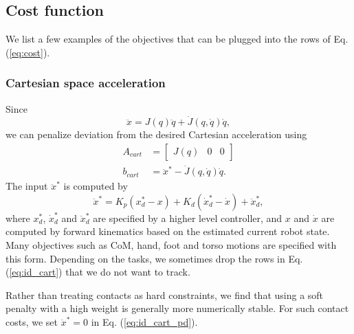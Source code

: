 \documentclass{ws-ijhr}
\newcommand{\eref}[1] {Eq. (\ref{#1})}
\begin{document}
\subsection{Cost function}
We list a few examples of the objectives that can be plugged into the rows of
\eref{eq:cost}. 
\subsubsection{Cartesian space acceleration} 
Since
\begin{equation}
  \ddot{x} = J(q)\ddot{q} + \dot{J}(q,\dot{q})\dot{q},
\end{equation}
we can penalize deviation from the desired Cartesian acceleration using
\begin{equation}
  \begin{split}
    A_{cart} &= \begin{bmatrix} J(q) & 0 & 0 \end{bmatrix} \\
    b_{cart} &= \ddot{x}^* -\dot{J}(q,\dot{q})\dot{q}.
		\label{eq:id_cart}
  \end{split}
\end{equation}  
The input $\ddot{x}^*$ is computed by
\begin{equation}
  \ddot{x}^* = K_p(x^*_d - x) + K_d(\dot{x}^*_d - \dot{x})  + \ddot{x}_d^*,
	\label{eq:id_cart_pd}
\end{equation}
where $x^*_d$, $\dot{x}^*_d$ and $\ddot{x}_d^*$ are specified by a higher 
level controller, and $x$ and $\dot{x}$ are computed by forward kinematics 
based on the estimated current robot state. 
Many objectives such as CoM, hand, foot and torso motions are 
specified with this form. Depending on the tasks, we sometimes drop the
rows in \eref{eq:id_cart} that we do not want to track. 

Rather than treating contacts as hard constraints, we find that using a soft 
penalty with a high weight is generally more numerically stable.
For such contact costs, we set $\ddot{x}^* = 0$ in \eref{eq:id_cart_pd}.
\end{document}
